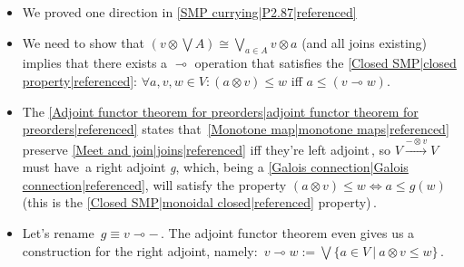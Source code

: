 \begin{itemize}
    \item  We proved one direction in \ref{SMP currying|P2.87|referenced}
    \item We need to show that $(v \otimes \bigvee A)\cong  \bigvee_{a \in A} v \otimes a$ (and all joins existing) implies that there exists a $\multimap$ operation that satisfies the \ref{Closed SMP|closed property|referenced}: $\forall a,v,w \in V: (a \otimes v) \leq w$ iff $a \leq (v \multimap w)$.
    \item The \ref{Adjoint functor theorem for preorders|adjoint functor theorem for preorders|referenced} states that \,\ref{Monotone map|monotone maps|referenced} preserve \ref{Meet and join|joins|referenced} iff they're left adjoint\,, so $V \xrightarrow{-\otimes v} V$ must have \,a right adjoint \emph{g}, which, being a \ref{Galois connection|Galois connection|referenced}, will satisfy the property $(a \otimes v) \leq w \iff a \leq g(w)$ (this is the \ref{Closed SMP|monoidal closed|referenced} property)\,.
    \item Let's rename \,$g \equiv v \multimap -$\,. The adjoint functor theorem even gives us a construction for the right adjoint, namely: \,$v \multimap w:=\bigvee\{a \in V\ |\ a \otimes v \leq w\}$\,.
  \end{itemize}
